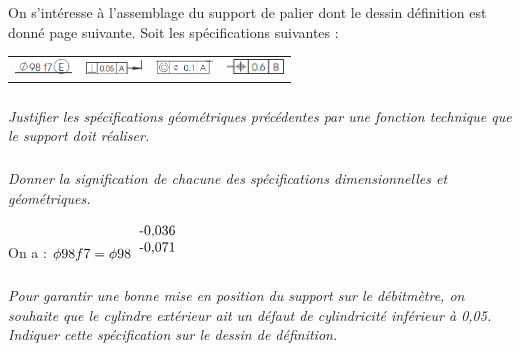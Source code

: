 \documentclass[10pt,fleqn]{article} %
\begin{document}
\begin{multicols}{2}
On s'intéresse à l'assemblage du support de palier dont le dessin définition est donné page suivante. 
Soit les spécifications suivantes : 
\begin{center}
\begin{tabular}{cccc}
\includegraphics[width=1.5cm]{images/debitmetre_05_a} &
\includegraphics[width=1.5cm]{images/debitmetre_05_b} &
\includegraphics[width=1.5cm]{images/debitmetre_05_c} &
\includegraphics[width=1.5cm]{images/debitmetre_05_d} \\
\end{tabular}
\end{center}

\subparagraph{}\textit{Justifier les spécifications géométriques précédentes par une fonction technique que le support doit réaliser. }

\subparagraph{}\textit{Donner la signification de chacune des spécifications dimensionnelles et géométriques.}

\begin{rem}
On a : $\phi 98 f7 = \phi 98 ^{\begin{tabular}{c}-0,036 \\ -0,071\end{tabular}}$
\end{rem}
\subparagraph{}\textit{Pour garantir une bonne mise en position du support sur le débitmètre, on souhaite que le cylindre extérieur ait un défaut de cylindricité inférieur à 0,05. Indiquer cette spécification sur le dessin de définition. }
\end{multicols}
\end{document}
